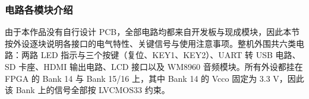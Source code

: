 \documentclass[withoutpreface,bwprint]{cumcmthesis}
\begin{document}
%
%

\subsubsection{电路各模块介绍}

由于本作品没有自行设计 PCB，全部电路均都来自开发板与现成模块，因此本节按外设逐块说明各接口的电气特性、关键信号与使用注意事项。整机外围共六类电路：两路 LED 指示与三个按键（复位、KEY1、KEY2）、UART 转 USB 电路、SD 卡座、HDMI 输出电路、LCD 接口以及 WM8960 音频模块。所有外设都挂在 FPGA 的 Bank 14 与 Bank 15/16 上，其中 Bank 14 的 Vcco 固定为 3.3 V，因此该 Bank 上的信号全部按 LVCMOS33 约束。
\end{document}
